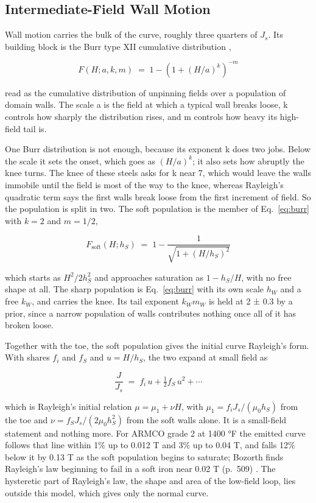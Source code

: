 \documentclass[
  11pt,
]{article}
\begin{document}
\subsection{Intermediate-Field Wall Motion}\label{intermediate-field-wall-motion}

Wall motion carries the bulk of the curve, roughly three quarters of \(J_s\). Its building block is the Burr type XII cumulative distribution \cite{wiki-burr},

\begin{equation}\label{eq:burr}
F(H;a,k,m) \;=\; 1-\left(1+(H/a)^{k}\right)^{-m}
\end{equation}

read as the cumulative distribution of unpinning fields over a population of domain walls. The scale a is the field at which a typical wall breaks loose, k controls how sharply the distribution rises, and m controls how heavy its high-field tail is.

One Burr distribution is not enough, because its exponent k does two jobs. Below the scale it sets the onset, which goes as \((H/a)^{k}\); it also sets how abruptly the knee turns. The knee of these steels asks for k near 7, which would leave the walls immobile until the field is most of the way to the knee, whereas Rayleigh's quadratic term says the first walls break loose from the first increment of field. So the population is split in two. The soft population is the member of Eq.~\eqref{eq:burr} with \(k = 2\) and \(m = 1/2\),

\[
F_{\text{soft}}(H;h_S) \;=\; 1 - \frac{1}{\sqrt{1 + (H/h_S)^{2}}}
\]

which starts as \(H^{2}/2h_S^{2}\) and approaches saturation as \(1 - h_S/H\), with no free shape at all. The sharp population is Eq.~\eqref{eq:burr} with its own scale \(h_W\) and a free \(k_W\), and carries the knee. Its tail exponent \(k_W m_W\) is held at 2 ± 0.3 by a prior, since a narrow population of walls contributes nothing once all of it has broken loose.

Together with the toe, the soft population gives the initial curve Rayleigh's form. With shares \(f_i\) and \(f_S\) and \(u = H/h_S\), the two expand at small field as

\[
\frac{J}{J_s} \;=\; f_i\,u + \tfrac{1}{2}f_S\,u^{2} + \cdots
\]

which is Rayleigh's initial relation \(\mu = \mu_1 + \nu H\), with \(\mu_1 = f_i J_s/(\mu_0 h_S)\) from the toe and \(\nu = f_S J_s/(2\mu_0 h_S^{2})\) from the soft walls alone. It is a small-field statement and nothing more. For ARMCO grade 2 at 1400 °F the emitted curve follows that line within 1\% up to 0.012 T and 3\% up to 0.04 T, and falls 12\% below it by 0.13 T as the soft population begins to saturate; Bozorth finds Rayleigh's law beginning to fail in a soft iron near 0.02 T (p.~509) \cite{bozorth1951}. The hysteretic part of Rayleigh's law, the shape and area of the low-field loop, lies outside this model, which gives only the normal curve.
\end{document}
